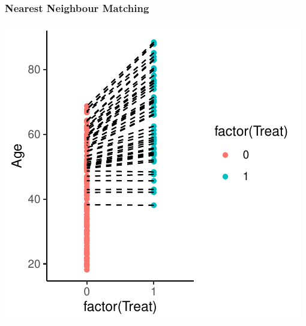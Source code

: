\documentclass[xcolor=x11names,compress]{beamer}\usepackage[]{graphicx}\usepackage[]{color}
\makeatletter
\def\maxwidth{ %
  \ifdim\Gin@nat@width>\linewidth
    \linewidth
  \else
    \Gin@nat@width
  \fi
}
\newenvironment{knitrout}{}{} %
\renewcommand{\(}{\begin{columns}}
\renewcommand{\)}{\end{columns}}
\newcommand{\<}[1]{\begin{column}{#1}}
\renewcommand{\>}{\end{column}}
\makeatother
\begin{document}
\begin{frame}
\frametitle{Nearest Neighbour Matching}
\begin{center}
\begin{knitrout}
\color{fgcolor}
\includegraphics[width=\maxwidth]{figure/nearest_matching_2-1} 

\end{knitrout}
\end{center}
\end{frame}
\end{document}

